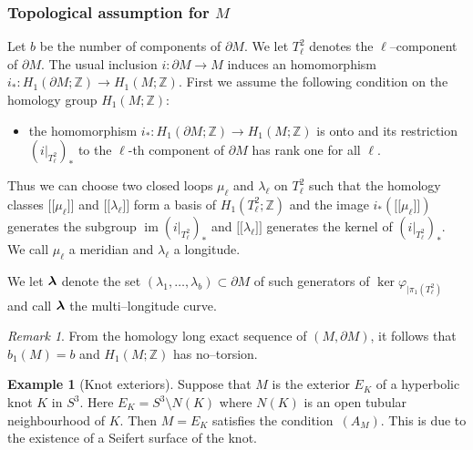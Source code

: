 \documentclass[a4paper]{amsart}
\theoremstyle{plain}
\theoremstyle{definition}
\newtheorem{example}{Example}%
\theoremstyle{remark}
\newtheorem{remark}{Remark}%
\newcommand{\ZZ}{{\mathbb Z}}
\newcommand{\bm}[1]{\mbox{\boldmath $#1$}}
\newcommand{\im}{\mathop{\mathrm{im}}\nolimits}
\newcommand{\bbrack}[1]{\lbrack \! \lbrack #1 \rbrack \! \rbrack}
\newcommand{\bord}{\partial}
\begin{document}
\subsubsection{Topological assumption for $M$}

Let $b$ be the number of components of $\bord
M$.  We let $T^2_\ell$ denotes the $\ell$--component of $\bord M$.  The usual inclusion $i:\bord M \to M$
  induces an homomorphism $i_* \colon H_1(\bord M;\ZZ) \to
  H_1(M;\ZZ)$. First we assume
the following condition on the homology group $H_1(M;\ZZ)$:
\begin{itemize}
\item[$(A_M)$] the homomorphism  $i_* \colon H_1(\bord M;\ZZ) \to
  H_1(M;\ZZ)$ is onto and its restriction  $(i|_{T^2_\ell})_*$ to the $\ell$-th component of $\partial M$ 
  has rank one for all $\ell$.
\end{itemize}
Thus we can choose two closed loops $\mu_\ell$ and $\lambda_\ell$ on $T^2_\ell$ 
such that the homology classes $\bbrack{\mu_\ell}$ and $\bbrack{\lambda_\ell}$ form a basis of 
$H_1(T^2_\ell;\ZZ)$ and the image $i_*(\bbrack{\mu_\ell})$ generates the subgroup $\im (i|_{T^2_\ell})_*$
and $\bbrack{\lambda_\ell}$ generates the kernel of $(i|_{T^2_\ell})_*$. We call $\mu_\ell$ a meridian and $\lambda_\ell$ a longitude.

We let $\bm{\lambda}$ denote the set 
$(\lambda_1, \ldots, \lambda_b) \subset \partial M$ of 
such generators of $\ker \varphi_{|\pi_1(T^2_\ell)}$
and call $\bm{\lambda}$ the multi--longitude curve.

\begin{remark}
  From the homology long exact sequence of $(M, \bord M)$, it follows
  that $b_1(M) = b$ and $H_1(M;\ZZ)$ has no--torsion.
\end{remark}

\begin{example}[Knot exteriors]\label{ex:knot}
Suppose that $M$ is the exterior $E_K$ of a
hyperbolic knot $K$ in $S^3$. Here $E_K = S^3 \setminus N(K)$ where $N(K)$ is an
open tubular neighbourhood of $K$.  Then $M = E_K$ satisfies the
condition~$(A_M)$. This is due to the existence of a Seifert
surface of the knot.
\end{example}
\end{document}
